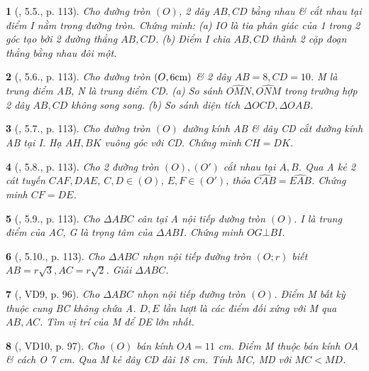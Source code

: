 \documentclass{article}
\newtheorem{baitoan}{}
\begin{document}
\begin{baitoan}[\cite{Binh_boi_duong_Toan_9_tap_1}, 5.5., p. 113]
	Cho đường tròn $(O)$, 2 dây $AB,CD$ bằng nhau \& cắt nhau tại điểm I nằm trong đường tròn. Chứng minh: (a) IO là tia phân giác của 1 trong 2 góc tạo bởi 2 đường thẳng $AB,CD$. (b) Điểm I chia $AB,CD$ thành 2 cặp đoạn thẳng bằng nhau đôi một.
\end{baitoan}

\begin{baitoan}[\cite{Binh_boi_duong_Toan_9_tap_1}, 5.6., p. 113]
	Cho đường tròn $(O,6{\rm cm})$ \& 2 dây $AB = 8,CD = 10$. M là trung điểm AB, N là trung điểm CD. (a) So sánh $\widehat{OMN},\widehat{ONM}$ trong trường hợp 2 dây $AB,CD$ không song song. (b) So sánh diện tích $\Delta OCD,\Delta OAB$.
\end{baitoan}

\begin{baitoan}[\cite{Binh_boi_duong_Toan_9_tap_1}, 5.7., p. 113]
	Cho đường tròn $(O)$ đường kính AB \& dây CD cắt đường kính AB tại I. Hạ $AH,BK$ vuông góc với CD. Chứng minh $CH = DK$.
\end{baitoan}

\begin{baitoan}[\cite{Binh_boi_duong_Toan_9_tap_1}, 5.8., p. 113]
	Cho 2 đường tròn $(O),(O')$ cắt nhau tại $A,B$. Qua A kẻ 2 cát tuyến $CAF,DAE$, $C,D\in(O)$, $E,F\in(O')$, thỏa $\widehat{CAB} = \widehat{EAB}$. Chứng minh $CF = DE$.
\end{baitoan}

\begin{baitoan}[\cite{Binh_boi_duong_Toan_9_tap_1}, 5.9., p. 113]
	Cho $\Delta ABC$ cân tại A nội tiếp đường  tròn $(O)$. I là trung điểm của AC, G là trọng tâm của $\Delta ABI$. Chứng minh $OG\bot BI$.
\end{baitoan}

\begin{baitoan}[\cite{Binh_boi_duong_Toan_9_tap_1}, 5.10., p. 113]
	Cho $\Delta ABC$ nhọn nội tiếp đường tròn $(O;r)$ biết $AB = r\sqrt{3},AC = r\sqrt{2}$. Giải $\Delta ABC$.
\end{baitoan}

\begin{baitoan}[\cite{Binh_Toan_9_tap_1}, VD9, p. 96]
	Cho $\Delta ABC$ nhọn nội tiếp đường tròn $(O)$. Điểm M bất kỳ thuộc cung BC không chứa A. $D,E$ lần lượt là các điểm đối xứng với M qua $AB,AC$. Tìm vị trí của M để DE lớn nhất.
\end{baitoan}

\begin{baitoan}[\cite{Binh_Toan_9_tap_1}, VD10, p. 97]
	Cho $(O)$ bán kính $OA = 11$ {\rm cm}. Điểm M thuộc bán kính OA \& cách O {\rm7 cm}. Qua M kẻ dây CD dài {\rm18 cm}. Tính MC, MD với $MC < MD$.
\end{baitoan}
\end{document}
